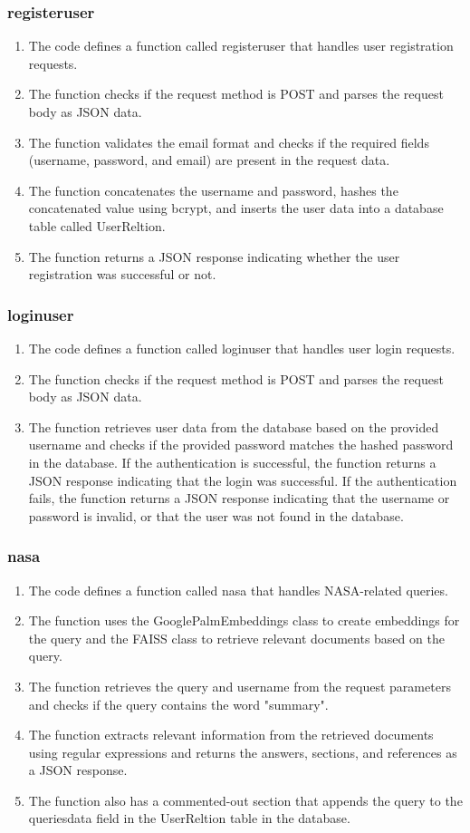\documentclass[11pt]{article}
\begin{document}
\subsubsection{registeruser}
\begin{enumerate}
	\item The code defines a function called registeruser that handles user registration requests.
	\item The function checks if the request method is POST and parses the request body as JSON data.
	\item The function validates the email format and checks if the required fields (username, password, and email) are present in the request data.
	\item The function concatenates the username and password, hashes the concatenated value using bcrypt, and inserts the user data into a database table called UserReltion.
	\item The function returns a JSON response indicating whether the user registration was successful or not.
\end{enumerate}
\subsubsection{loginuser}
\begin{enumerate}
	\item The code defines a function called loginuser that handles user login requests.
	\item The function checks if the request method is POST and parses the request body as JSON data.
	\item The function retrieves user data from the database based on the provided username and checks if the provided password matches the hashed password in the database.
	      If the authentication is successful, the function returns a JSON response indicating that the login was successful.
	      If the authentication fails, the function returns a JSON response indicating that the username or password is invalid, or that the user was not found in the database.
\end{enumerate}
\subsubsection{nasa}
\begin{enumerate}
	\item The code defines a function called nasa that handles NASA-related queries.
	\item The function uses the GooglePalmEmbeddings class to create embeddings for the query and the FAISS class to retrieve relevant documents based on the query.
	\item The function retrieves the query and username from the request parameters and checks if the query contains the word "summary".
	\item The function extracts relevant information from the retrieved documents using regular expressions and returns the answers, sections, and references as a JSON response.
	\item The function also has a commented-out section that appends the query to the queriesdata field in the UserReltion table in the database.
\end{enumerate}
\end{document}
